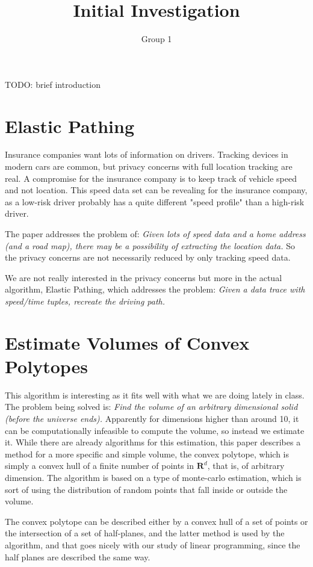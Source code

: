 \documentclass[11pt]{article}
\title{Initial Investigation}
\author{Group 1}
\begin{document}
\maketitle

TODO: brief introduction

\section{Elastic Pathing\cite{Gao}}
Insurance companies want lots of information on drivers. Tracking devices in modern cars are common, but privacy concerns with full location tracking are real. A compromise for the insurance company is to keep track of vehicle speed and not location. This speed data set can be revealing for the insurance company, as a low-risk driver probably has a quite different "speed profile" than a high-risk driver.

The paper addresses the problem of:  {\em Given lots of speed data and a home address (and a road map), there may be a possibility of extracting the location data.}  So the privacy concerns are not necessarily reduced by only tracking speed data.

We are not really interested in the privacy concerns but more in the actual algorithm, Elastic Pathing, which addresses the problem:
{\em Given a data trace with speed/time tuples, recreate the driving path.}

\section{Estimate Volumes of Convex Polytopes\cite{Ge}}
This algorithm is interesting as it fits well with what we are doing lately in class. The problem being solved is:  {\em Find the volume of an arbitrary dimensional solid (before the universe ends).}  Apparently for dimensions higher than around 10, it can be computationally infeasible to compute the volume, so instead we estimate it. While there are already algorithms for this estimation, this paper describes a method for a more specific and simple volume, the convex polytope, which is simply a convex hull of a finite number of points in $\mathbf{R}^d$, that is, of arbitrary dimension.
The algorithm is based on a type of monte-carlo estimation, which is sort of using the distribution of random points that fall inside or outside the volume.

The convex polytope can be described either by a convex hull of a set of points or the intersection of a set of half-planes, and the latter method is used by the algorithm, and that goes nicely with our study of linear programming, since the half planes are described the same way.
\end{document}
